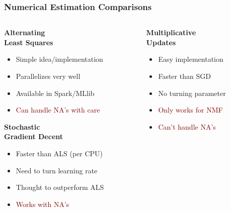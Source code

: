\documentclass[xcolor={dvipsnames}]{beamer}
\begin{document}
\frame
{
\frametitle{Numerical Estimation Comparisons}


\begin{columns}
\begin{column}{.5\textwidth}


\LARGE
\textbf{Alternating\\ Least Squares}
\normalsize 

\begin{itemize}
\item<2-> Simple idea/implementation
\item<2-> Parallelizes very well
\item<2-> Available in Spark/MLlib
\item<4-> \textcolor{Maroon}{Can handle NA's with care}
\end{itemize}



\LARGE
\textbf{Stochastic\\Gradient Decent}
\normalsize 

\begin{itemize}
\item<2-> Faster than ALS (per CPU) 
\item<3-> \textcolor{NavyBlue}{Need to turn learning rate}
\item<3-> \textcolor{NavyBlue}{Thought to outperform ALS}
\item<4-> \textcolor{Maroon}{Works with NA's}
\end{itemize}


\end{column}
\begin{column}{.5\textwidth}

\LARGE
\textbf{Multiplicative\\ Updates}
\normalsize 

\begin{itemize}
\item<2-> Easy implementation
\item<2-> Faster than SGD
\item<3-> \textcolor{NavyBlue}{No turning parameter}
\item<4-> \textcolor{Maroon}{Only works for NMF}
\item<4-> \textcolor{Maroon}{Can't handle NA's}
\end{itemize}


\end{column}
\end{columns}

}
\end{document}
